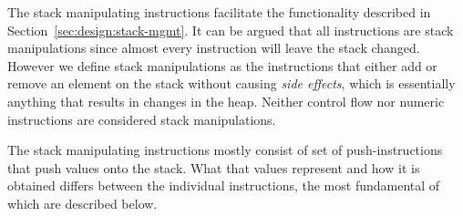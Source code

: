 The stack manipulating instructions facilitate the functionality described in
Section~\ref{sec:design:stack-mgmt}. It can be argued that all instructions are
stack manipulations since almost every instruction will leave the stack
changed. However we define stack manipulations as the instructions that either
add or remove an element on the stack without causing \textit{side effects},
which is essentially anything that results in changes in the heap. Neither
control flow nor numeric instructions are considered stack manipulations.

The stack manipulating instructions mostly consist of set of push-instructions
that push values onto the stack. What that values represent and how it is
obtained differs between the individual instructions, the most fundamental of
which are described below.

